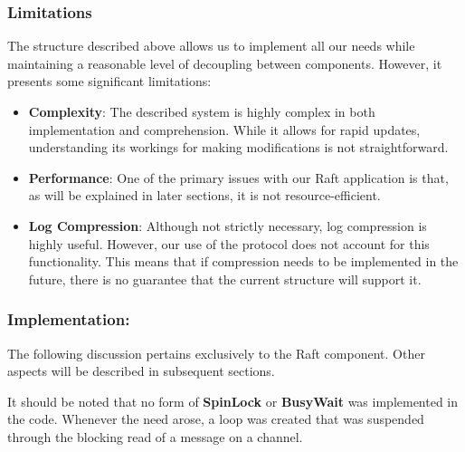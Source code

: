 \subsubsection{Limitations}
The structure described above allows us to implement all our needs while maintaining a 
reasonable level of decoupling between components. However, it presents some significant limitations:
\begin{itemize}
    \item \textbf{Complexity}: The described system is highly complex in both implementation 
      and comprehension. While it allows for rapid updates, understanding its workings 
      for making modifications is not straightforward.
    \item \textbf{Performance}: One of the primary issues with our Raft application is that, 
      as will be explained in later sections, it is not resource-efficient.
    \item \textbf{Log Compression}: Although not strictly necessary, log compression is 
      highly useful. However, our use of the protocol does not account for this functionality. 
      This means that if compression needs to be implemented in the future, there is no 
      guarantee that the current structure will support it.
\end{itemize}

\subsubsection{Implementation:\\}
The following discussion pertains exclusively to the Raft component. Other aspects will be 
described in subsequent sections.

It should be noted that no form of \textbf{SpinLock} or \textbf{BusyWait} was implemented 
in the code. Whenever the need arose, a loop was created that was suspended through the 
blocking read of a message on a channel.

